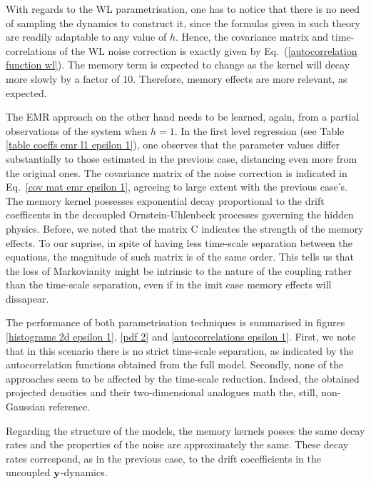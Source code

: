 \documentclass[12pt]{article}
\begin{document}
With regards to the WL parametrisation, one has to notice that there is no need of sampling the dynamics to construct it, since the formulas given in such theory are readily adaptable to any value of $h$. Hence, the covariance matrix and time-correlations of the WL noise correction is exactly given by Eq.~(\ref{autocorrelation function wl}). The memory term is expected to change as the kernel will decay more slowly by a factor of $10$. Therefore, memory effects are more relevant, as expected.

The EMR approach on the other hand needs to be learned, again, from a partial observations of the system when $h=1$. In the first level regression (see Table \ref{table coeffs emr l1 epsilon 1}), one observes that the parameter values differ substantially to those estimated in the previous case, distancing even more from the original ones. The covariance matrix of the noise correction is indicated in Eq.~\ref{cov mat emr epsilon 1}, agreeing to large extent with the previous case's. The memory kernel possesses exponential decay proportional to the drift coefficents in the decoupled Ornstein-Uhlenbeck processes governing the hidden physics. Before, we noted that the matrix  $\mathrm{C}$ indicates the strength of the memory effects. To our suprise, in spite of having less time-scale separation between the equations, the magnitude of such matrix is of the same order. This tells us that the loss of Markovianity might be intrinsic to the nature of the coupling rather than the time-scale separation, even if in the imit case memory effects will dissapear.

The performance of both parametrisation techniques is summarised in figures \ref{histograms 2d epsilon 1}, \ref{pdf 2} and \ref{autocorrelations epsilon 1}. First, we note that in this scenario there is no strict time-scale separation, as indicated by the autocorrelation functions obtained from the full model. Secondly, none of the approaches seem to be affected by the time-scale reduction. Indeed, the obtained projected densities and their two-dimensional analogues math the, still, non-Gaussian reference.

 Regarding the structure of the models, the memory kernels posses the same decay rates and the properties of the noise are approximately the same. These decay rates correspond, as in the previous case, to the drift cocefficients in the uncoupled $\mathbf{y}$-dynamics.
\end{document}
